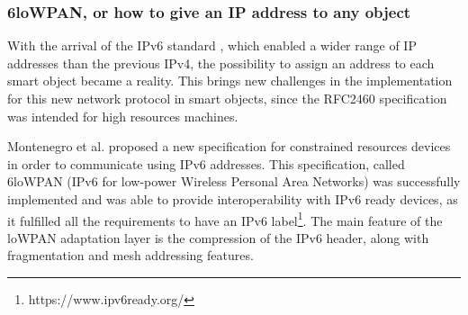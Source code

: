 \subsubsection{6loWPAN, or how to give an IP address to any object}
With the arrival of the IPv6 standard \cite{rfc2460}, which enabled a wider range of IP addresses than the previous IPv4, the possibility to assign an address to each smart object became a reality.
This brings new challenges in the implementation for this new network protocol in smart objects, since the RFC2460 \cite{rfc2460} specification was intended for high resources machines.

Montenegro et al. proposed a new specification \cite{rfc4944} for constrained resources devices in order to communicate using IPv6 addresses.
This specification, called 6loWPAN (IPv6 for low-power Wireless Personal Area Networks) was successfully implemented \cite{durvy08making} and was able to provide interoperability with IPv6 ready devices, as it fulfilled all the requirements to have an IPv6 label\footnote{https://www.ipv6ready.org/}.
The main feature of the loWPAN adaptation layer is the compression of the IPv6 header, along with fragmentation and mesh addressing features.





